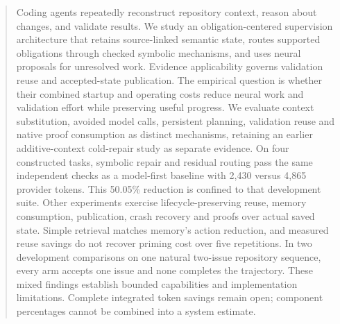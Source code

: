 \begin{abstract}
Coding agents repeatedly reconstruct repository context, reason about changes,
and validate results. We study an obligation-centered supervision architecture
that retains source-linked semantic state, routes supported obligations through
checked symbolic mechanisms, and uses neural proposals for unresolved work.
Evidence applicability governs validation reuse and accepted-state publication.
The empirical question is whether their combined startup and operating costs
reduce neural work and validation effort while preserving useful progress.
We evaluate context substitution, avoided model calls, persistent planning,
validation reuse and native proof consumption as distinct mechanisms, retaining
an earlier additive-context cold-repair study as separate evidence.
On four constructed tasks, symbolic repair and residual routing pass the same
independent checks as a model-first baseline with 2,430 versus 4,865 provider
tokens. This 50.05\% reduction is confined to that development suite.
Other experiments exercise lifecycle-preserving reuse, memory consumption,
publication, crash recovery and proofs over actual saved state. Simple
retrieval matches memory's action reduction, and measured reuse savings do
not recover priming cost over five repetitions. In two development comparisons
on one natural two-issue repository sequence, every arm accepts one issue and
none completes the trajectory. These mixed findings establish bounded capabilities and
implementation limitations. Complete integrated token savings remain open;
component percentages cannot be combined into a system estimate.
\end{abstract}
